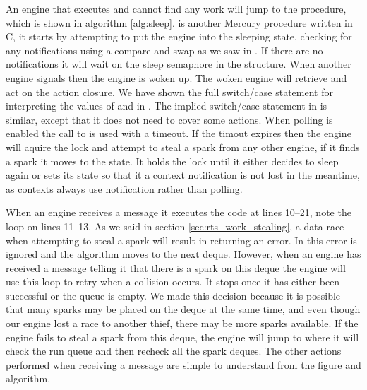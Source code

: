 An engine that executes \idle and cannot find any work will jump to the
\sleep procedure,
which is shown in algorithm \ref{alg:sleep}.
\sleep is another Mercury procedure written in C,
it starts by attempting to put the engine into the sleeping state,
checking for any notifications using a compare and swap as we saw in \idle.
If there are no notifications it will wait on the sleep semaphore in the
\enginesleepsync structure.
When another engine signals  then the engine is woken up.
The woken engine will retrieve and act on the action closure.
We have shown the full switch/case statement for interpreting the values of
 and  in \sleep.
The implied switch/case statement in \idle is similar,
except that it does not need to cover some actions.
When polling is enabled the call to  is used with a
timeout.
If the timout expires then the engine will aquire the lock and attempt to
steal a spark from any other engine, if it finds a spark it moves to the
 state.
It holds the lock until it either decides to sleep again or sets its state
so that it a context notification is not lost in the meantime,
as contexts always use notification rather than polling.

When an engine receives a  message it executes the
code at lines 10--21,
note the loop on lines 11--13.
As we said in section \ref{sec:rts_work_stealing},
a data race when attempting to steal a spark will result in
\steal returning an error.
In \trystealspark this error is ignored and the algorithm moves to the next
deque.
However,
when an engine has received a message telling it that there is a spark on
this deque the engine will use this loop to retry when a collision occurs.
It stops once it has either been successful or the queue is empty.
We made this decision because it is possible that many sparks may be placed
on the deque at the same time,
and even though our engine lost a race to another thief, there may be more
sparks available.
If the engine fails to steal a spark from this deque,
the engine will jump to \idle where it will check the run queue and then
recheck all the spark deques.
The other actions performed when receiving a message are simple to
understand from the figure and algorithm.

